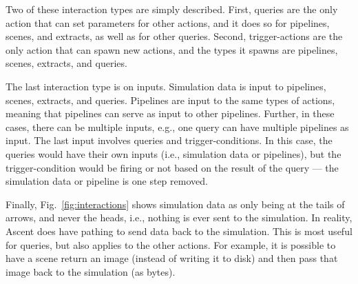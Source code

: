 Two of these interaction types are simply described.
%
First, queries are the only action that can set parameters for other actions, and it does so for
pipelines, scenes, and extracts, as well as for other queries.
%
Second, trigger-actions are the only action that can spawn new actions, and the types it spawns are
pipelines, scenes, extracts, and queries.
%

The last interaction type is on inputs.
%
Simulation data is input to pipelines, scenes, extracts, and queries.
%
Pipelines are input to the same types of actions, meaning that pipelines can serve as input
to other pipelines.
%
Further, in these cases, there can be multiple inputs, e.g., one query can have multiple
pipelines as input.
%
The last input involves queries and trigger-conditions.
%
In this case, the queries would have their own inputs (i.e., simulation data or pipelines),
but the trigger-condition would be firing or not based on the result of the query ---
the simulation data or pipeline is one step removed.

Finally, Fig.~\ref{fig:interactions} shows simulation data as only being at the tails of arrows,
and never the heads, i.e., nothing is ever sent to the simulation.
%
In reality, Ascent does have pathing to send data back to the simulation.
%
This is most useful for queries, but also applies to the other actions.
%
For example, it is possible to have a scene return an image (instead of writing it to disk)
and then pass that image back to the simulation (as bytes).


